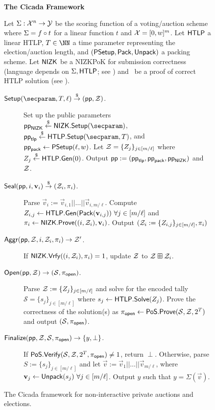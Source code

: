 \begin{figure*}[t!]
\begin{mdframed}
\begin{center}
    \textbf{The Cicada Framework}
\end{center}
Let $\Sigma: \mathcal{X}^n \rightarrow \mathcal{Y}$ be the scoring function of a voting/auction scheme
where $\Sigma = f \circ t$ for a linear function $t$ and
$\mathcal{X} = [0,w]^m$. 
Let $\mathsf{HTLP}$ a linear HTLP, $\Ttime \in \NN$ a time parameter representing the election/auction length, and $(\mathsf{PSetup}, \mathsf{Pack}, \mathsf{Unpack})$ a packing scheme.
Let $\mathsf{NIZK}$ be a NIZKPoK for 
submission correctness (language depends on $\Sigma, \mathsf{HTLP}$; see )
and \pos\ be a proof of correct HTLP solution (see ). 

\hrulefill %
\begin{description}
    \item[$\Setup(\secparam, \Ttime, \ell) \randout (\pp, \Z)$.] 
    Set up the public parameters $\pp_{\NIZK} \sample \NIZK.\Setup(\secparam)$, $\pp_{\sf tlp} \sample \htlp.\Setup(\secparam, \Ttime)$, and $\mathsf{pp}_{\sf pack} \gets \mathsf{PSetup}(\ell, w)$. 
    Let $\mathcal{Z} = \{Z_j\}_{j \in [m/\ell]}$ where $Z_j \stackrel{\$}{\gets} \mathsf{HTLP}.{\sf Gen}(0)$. Output $\mathsf{pp} := (\mathsf{pp}_{\sf tlp}, \mathsf{pp}_{\sf pack}, \mathsf{pp}_{\mathsf{NIZK}})$ and $\mathcal{Z}$.
    \item[$\mathsf{Seal}(\mathsf{pp},i, \mathbf{v}_i) \stackrel{\$}{\to} (\mathcal{Z}_i, \pi_i)$.] Parse $\vec{v}_i := \vec{v}_{i,1} || \dots || \vec{v}_{i,m/\ell}$. Compute $Z_{i,j} \gets \mathsf{HTLP}.{\sf Gen}(\mathsf{Pack}(\mathbf{v}_{i,j}))~\forall j \in [m/\ell]$ and $\pi_i \gets \mathsf{NIZK}.\mathsf{Prove}((i, \mathcal{Z}_i), \mathbf{v}_i)$.
    Output $(\mathcal{Z}_i := \{Z_{i,j}\}_{j \in [m/\ell]}, \pi_i)$ 
    \item[$\mathsf{Aggr}(\mathsf{pp},\mathcal{Z},i,\mathcal{Z}_i,\pi_i) \rightarrow \mathcal{Z}'$.] If $\mathsf{NIZK}.\mathsf{Vrfy}((i, \mathcal{Z}_i), \pi_i) = 1$, update $\mathcal{Z}$ to $\mathcal{Z} \boxplus \mathcal{Z}_i$. %
    \item[$\mathsf{Open}(\mathsf{pp},\mathcal{Z}) \rightarrow (\mathcal{S}, \pi_{\sf open})$.] Parse $\mathcal{Z} := \{Z_j\}_{j \in [m/\ell]}$ and solve for the encoded tally $\mathcal{S} = \{s_j\}_{j \in [m/\ell]}$ where $s_j \gets \mathsf{HTLP}.{\sf Solve}(Z_j)$. Prove the correctness of the solution(s) as $\pi_{\sf open} \gets {\sf PoS}.{\sf Prove}(\mathcal{S}, \mathcal{Z}, 2^{T})$ and output $(\mathcal{S}, \pi_{\sf open})$.
    \item[$\mathsf{Finalize}(\mathsf{pp}, \mathcal{Z}, \mathcal{S}, \pi_{\sf open}) \rightarrow \{y,\perp\}$.] If ${\sf PoS}.{\sf Verify}(\mathcal{S}, \mathcal{Z}, 2^{T}, \pi_{\sf open}) \neq 1$, return $\perp$. Otherwise, parse $S := \{s_j\}_{j \in [m/\ell]}$ and let $\Vec{v} := \vec{v}_1 || \dots || \vec{v}_{m/\ell}$, where $\mathbf{v}_j \gets \mathsf{Unpack}(s_j)~\forall j \in [m/\ell]$. Output 
    $y$ such that $y = \Sigma(\vec{v})$.
\end{description}
\end{mdframed}
\caption{The Cicada framework for non-interactive private auctions and elections.}
\label{fig:cicada}
\end{figure*}